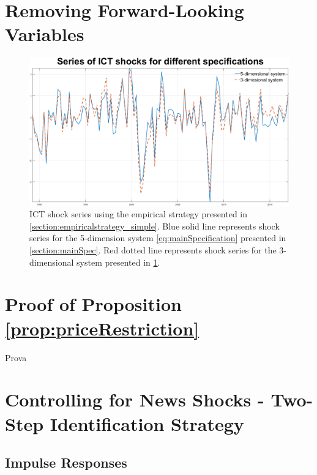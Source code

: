\documentclass[12pt]{article}
\begin{document}
\newpage

 \section{Removing Forward-Looking Variables}\label{section:removing_FL_Var}
 
 
 	\begin{figure}[h!]
 	\begin{center}
 		\includegraphics[scale=0.35]{MainFigures/Removing_FLVariables}
 		\caption{ICT shock series using the empirical strategy presented in \ref{section:empiricalstrategy_simple}. Blue solid line represents shock series for the 5-dimension system \ref{eq:mainSpecification} presented in \ref{section:mainSpec}. Red dotted line represents shock series for the 3-dimensional system presented in \ref{section:removing_FL_Var}.}
 		\label{fig:shockSeries_removing}
 	\end{center} 
 \end{figure}

\newpage

\section{Proof of Proposition \ref{prop:priceRestriction}}\label{section:proofpriceRestriction}

Prova


\newpage

\section{Controlling for News Shocks - Two-Step Identification Strategy}

\subsection{Impulse Responses}\label{section:IRF_2step}
\end{document}
